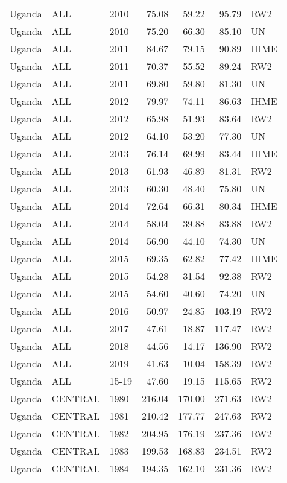 \begin{longtable}{lllrrrl}
  Uganda & ALL & 2010 & 75.08 & 59.22 & 95.79 & RW2 \\ 
  Uganda & ALL & 2010 & 75.20 & 66.30 & 85.10 & UN \\ 
  Uganda & ALL & 2011 & 84.67 & 79.15 & 90.89 & IHME \\ 
  Uganda & ALL & 2011 & 70.37 & 55.52 & 89.24 & RW2 \\ 
  Uganda & ALL & 2011 & 69.80 & 59.80 & 81.30 & UN \\ 
  Uganda & ALL & 2012 & 79.97 & 74.11 & 86.63 & IHME \\ 
  Uganda & ALL & 2012 & 65.98 & 51.93 & 83.64 & RW2 \\ 
  Uganda & ALL & 2012 & 64.10 & 53.20 & 77.30 & UN \\ 
  Uganda & ALL & 2013 & 76.14 & 69.99 & 83.44 & IHME \\ 
  Uganda & ALL & 2013 & 61.93 & 46.89 & 81.31 & RW2 \\ 
  Uganda & ALL & 2013 & 60.30 & 48.40 & 75.80 & UN \\ 
  Uganda & ALL & 2014 & 72.64 & 66.31 & 80.34 & IHME \\ 
  Uganda & ALL & 2014 & 58.04 & 39.88 & 83.88 & RW2 \\ 
  Uganda & ALL & 2014 & 56.90 & 44.10 & 74.30 & UN \\ 
  Uganda & ALL & 2015 & 69.35 & 62.82 & 77.42 & IHME \\ 
  Uganda & ALL & 2015 & 54.28 & 31.54 & 92.38 & RW2 \\ 
  Uganda & ALL & 2015 & 54.60 & 40.60 & 74.20 & UN \\ 
  Uganda & ALL & 2016 & 50.97 & 24.85 & 103.19 & RW2 \\ 
  Uganda & ALL & 2017 & 47.61 & 18.87 & 117.47 & RW2 \\ 
  Uganda & ALL & 2018 & 44.56 & 14.17 & 136.90 & RW2 \\ 
  Uganda & ALL & 2019 & 41.63 & 10.04 & 158.39 & RW2 \\ 
  Uganda & ALL & 15-19 & 47.60 & 19.15 & 115.65 & RW2 \\ 
  Uganda & CENTRAL & 1980 & 216.04 & 170.00 & 271.63 & RW2 \\ 
  Uganda & CENTRAL & 1981 & 210.42 & 177.77 & 247.63 & RW2 \\ 
  Uganda & CENTRAL & 1982 & 204.95 & 176.19 & 237.36 & RW2 \\ 
  Uganda & CENTRAL & 1983 & 199.53 & 168.83 & 234.51 & RW2 \\ 
  Uganda & CENTRAL & 1984 & 194.35 & 162.10 & 231.36 & RW2 \\ 

\end{longtable}
